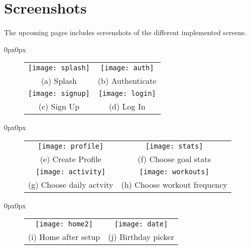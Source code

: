 \documentclass{article}
\begin{document}
    \hfill \break

    \section{Screenshots}
        \paragraph{}
        The upcoming pages includes screenshots of the different implemented screens.
        
    \addtolength{\topmargin}{-.575in}
    \begin{adjustwidth}{0px}{0px}
        \begin{figure}
          \begin{tabular}{cc}
            \texttt{[image: splash]} & \texttt{[image: auth]} \\
          (a) Splash & (b) Authenticate \\[25pt]
          \texttt{[image: signup]} & \texttt{[image: login]} \\
          (c) Sign Up & (d) Log In \\[25pt]
          \end{tabular}
        \end{figure}
      \end{adjustwidth}

      \begin{adjustwidth}{0px}{0px}
        \begin{figure}
          \begin{tabular}{cc}
            \texttt{[image: profile]} & \texttt{[image: stats]} \\
          (e) Create Profile & (f) Choose goal stats \\[25pt]
          \texttt{[image: activity]} & \texttt{[image: workouts]} \\
          (g) Choose daily actvity & (h) Choose workout frequency \\[25pt]
          \end{tabular}
        \end{figure}
      \end{adjustwidth}

      \begin{adjustwidth}{0px}{0px}
        \begin{figure}
          \begin{tabular}{cc}
            \texttt{[image: home2]} & \texttt{[image: date]} \\
          (i) Home after setup & (j) Birthday picker \\[25pt]
          \end{tabular}
        \end{figure}
      \end{adjustwidth}
\end{document}
